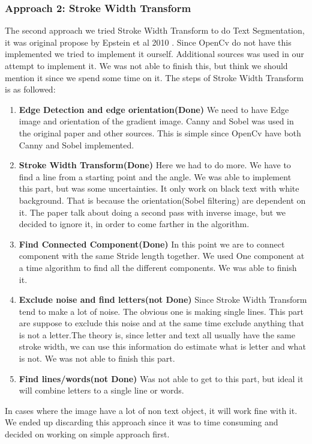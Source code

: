 \documentclass[11pt,a4paper,UKenglish]{report}
\begin{document}
\begin{flushleft}
  \subsubsection{Approach 2: Stroke Width Transform}
  The second approach we tried Stroke Width Transform to do Text Segmentation, it was original propose by Epstein et al 2010 \cite{epshtein_stroke_2010}. Since OpenCv do not have this implemented we tried to implement it ourself. Additional sources was used in our attempt to implement it\cite{werner_text_????, _c++_????, bunn_strokewidthtransform:_2018}. We was not able to finish this, but think we should mention it since we spend some time on it. The steps of Stroke Width Transform is as followed:
  \begin{enumerate}
    \item \textbf{Edge Detection and edge orientation(Done)}
    We need to have Edge image and orientation of the gradient image.
    Canny and Sobel was used in the original paper and other sources. This is simple since OpenCv have both Canny and Sobel implemented.
    \item \textbf{Stroke Width Transform(Done)}
    Here we had to do more. We have to find a line from a starting point and the angle. We was able to implement this part, but was some uncertainties. It only work on black text with white background. That is because the orientation(Sobel filtering) are dependent on it. The paper talk about doing a second pass with inverse image, but we decided to ignore it, in order to come farther in the algorithm.
    \item \textbf{Find Connected Component(Done)}
    In this point we are to connect component with the same Stride length together. We used One component at a time algorithm to find all the different components. We was able to finish it.
    \item \textbf{Exclude noise and find letters(not Done)}
    Since Stroke Width Transform tend to make a lot of noise. The obvious one is making single lines. This part are suppose to exclude this noise and at the same time exclude anything that is not a letter.The theory is, since letter and text all usually have the same stroke width, we can use this information do estimate what is letter and what is not. We was not able to finish this part.
    \item \textbf{Find lines/words(not Done)}
    Was not able to get to this part, but ideal it will combine letters to a single line or words.
  \end{enumerate}
  In cases where the image have a lot of non text object, it will work fine with it. We ended up discarding this approach since it was to time consuming and decided on working on simple approach first.
\end{flushleft}
\end{document}
